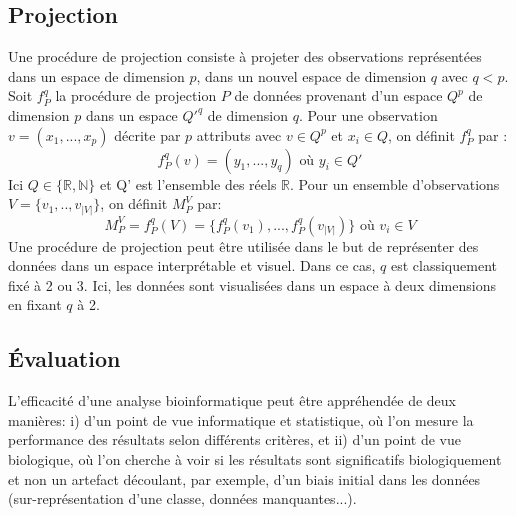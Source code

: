\subsection{Projection}\label{parproj}
Une procédure de projection consiste à projeter des observations représentées dans un espace de dimension $p$, dans un nouvel espace de dimension $q$ avec $q<p$.\\
Soit $f_{P}^{q}$ la procédure de projection $P$ de données provenant d'un espace $Q^{p}$ de dimension $p$ dans un espace $Q'^{q}$ de dimension $q$. Pour une observation $v=(x_{1},...,x_{p})$ décrite par $p$ attributs avec $v \in Q^{p}$ et $x_{i} \in Q$, on définit $f_{P}^{q}$ par :
\begin{equation}
f_{P}^{q}(v)=(y_{1},...,y_{q}) \textrm{ où } y_{i} \in Q'
\end{equation}
Ici $Q \in \{\mathbb{R},\mathbb{N}\}$ et Q' est l'ensemble des réels $\mathbb{R}$. Pour un ensemble d'observations $V=\{v_{1},..,v_{|V|}\}$, on définit $M^{V}_{P}$ par:
\begin{equation}
M^{V}_{P}=f_{P}^{q}(V)=\{f_{P}^{q}(v_{1}),...,f_{P}^{q}(v_{|V|}) \} \textrm{ où } v_{i} \in V
\end{equation} 
Une procédure de projection peut être utilisée dans le but de représenter des données dans un espace interprétable et visuel. Dans ce cas, $q$ est classiquement fixé à 2 ou 3. Ici, les données sont visualisées dans un espace à deux dimensions en fixant $q$ à 2.


\subsection{Évaluation}\label{analyseeval}
L'efficacité d'une analyse bioinformatique peut être appréhendée de deux manières: i) d'un point de vue informatique et statistique, où l'on mesure la performance des résultats selon différents critères, et ii) d'un point de vue biologique, où l'on cherche à voir si les résultats sont significatifs biologiquement et non un artefact découlant, par exemple, d'un biais initial dans les données (sur-représentation d'une classe, données manquantes...).

